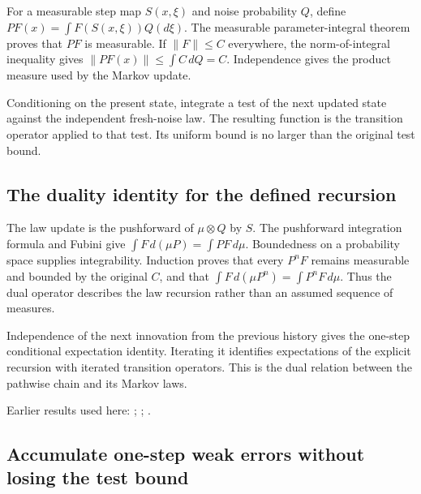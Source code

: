 \documentclass[11pt,a4paper]{report}
\begin{document}
For a measurable step map \(S(x,\xi)\) and noise probability \(Q\), define \(PF(x)=\int F(S(x,\xi))Q(d\xi)\). The measurable parameter-integral theorem proves that \(PF\) is measurable. If \(\lVert F\rVert\le C\) everywhere, the norm-of-integral inequality gives \(\lVert PF(x)\rVert\le\int C\,dQ=C\). Independence gives the product measure used by the Markov update.



Conditioning on the present state, integrate a test of the next updated state against the independent fresh-noise law. The resulting function is the transition operator applied to that test. Its uniform bound is no larger than the original test bound.

\subsection{\texorpdfstring{The duality identity for the defined recursion}{The duality identity for the defined recursion}}
\label{report-step-KineticLangevin-MarkovTests-lean-2}


The law update is the pushforward of \(\mu\otimes Q\) by \(S\). The pushforward integration formula and Fubini give \(\int F\,d(\mu P)=\int PF\,d\mu\). Boundedness on a probability space supplies integrability. Induction proves that every \(P^nF\) remains measurable and bounded by the original \(C\), and that \(\int F\,d(\mu P^n)=\int P^nF\,d\mu\). Thus the dual operator describes the law recursion rather than an assumed sequence of measures.



Independence of the next innovation from the previous history gives the one-step conditional expectation identity. Iterating it identifies expectations of the explicit recursion with iterated transition operators. This is the dual relation between the pathwise chain and its Markov laws.



Earlier results used here: \cite[Section~3.33.11]{LangevinLean2026ULASC}; \cite[Section~3.33.5]{LangevinLean2026ULASC}; \cite[Section~3.33.6]{LangevinLean2026ULASC}.
\subsection{\texorpdfstring{Accumulate one-step weak errors without losing the test bound}{Accumulate one-step weak errors without losing the test bound}}
\label{report-step-KineticLangevin-MarkovTests-lean-3}
\end{document}
